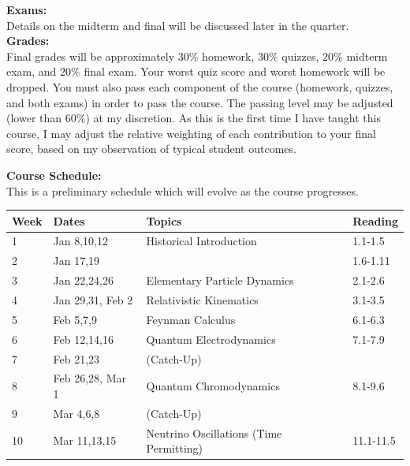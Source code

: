 \documentclass[12pt]{article}
\begin{document}
\noindent
\noindent
\textbf{Exams:}\\
Details on the midterm and final will be discussed later in the quarter.\\[3pt]

\noindent
\textbf {Grades:}\\
Final grades will be approximately $30\%$ homework, $30\%$ quizzes, $20\%$ midterm exam, 
and $20\%$ final exam. Your worst quiz score and worst homework will be dropped.  
You must also pass each component of the course (homework, quizzes, and both exams) in order to pass the course.  The passing level may be adjusted (lower than $60\%$) at my discretion. As this is the first time I have taught this course, I may adjust the relative weighting of each contribution to your final score, based on my observation of typical student outcomes.\\
\noindent


\noindent
\textbf {Course Schedule:}\\
This is a preliminary schedule which will evolve as the course progresses.\\

\noindent
\begin{tabular}{llll}
\textbf{Week} & \textbf{Dates} & \textbf{Topics} & \textbf{Reading} \\
\hline
1  & Jan 8,10,12      & Historical Introduction & 1.1-1.5    \\
\hline
2  & Jan 17,19        &                         &  1.6-1.11 \\
\hline
3  & Jan 22,24,26     & Elementary Particle Dynamics & 2.1-2.6 \\  
\hline
4  & Jan 29,31, Feb 2 & Relativistic Kinematics     & 3.1-3.5    \\
\hline
5  & Feb 5,7,9        & Feynman Calculus  & 6.1-6.3    \\
\hline
6  & Feb 12,14,16     & Quantum Electrodynamics & 7.1-7.9     \\
\hline
7  & Feb 21,23        & (Catch-Up)    & \\
\hline
8  & Feb 26,28, Mar 1 & Quantum Chromodynamics &   8.1-9.6\\
\hline
9  & Mar 4,6,8        & (Catch-Up)   & \\
\hline
10 & Mar 11,13,15     & Neutrino Oscillations (Time Permitting) & 11.1-11.5\\
\hline
\end{tabular}\\ \vskip 1cm
\end{document}
